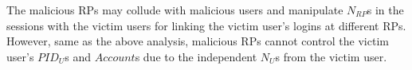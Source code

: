 The malicious RPs may collude with  malicious users and manipulate $N_{RP}$s in the sessions with the victim users for linking the victim user's logins at different RPs.
However, same as the above analysis, malicious RPs cannot control the victim user's $PID_U$s and $Account$s due to the independent $N_U$s from the victim user.  

 


\begin{comment}
UPRESSO only introduces small modifications to OIDC. As analyzed in Section~\ref{subsec:compatible}, UPRESSO doesn't modify the mechanisms (i.e., digital signature and HTTPS) for integrity and confidentiality of the identity proof; but only slightly modify the receiver designation and user identification.
The detailed modifications include: (1) the $ID_{RP}$ and endpoint in the identity proof are replaced with $PID_{RP}$ and one-time endpoint, while the generation of $PID_{RP}$ further introduces  a negotiation process and a modified dynamic registration;
 (2) IdP generates $PID_U$ based on $PID_{RP}$ instead of $ID_{RP}$, (3) RP calculates $Account$ from the changing $PID_U$ instead of an unchanged value.


\end{comment}

